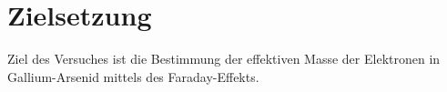 \section{Zielsetzung}
\label{sec:zielsetzung}

Ziel des Versuches ist die Bestimmung der effektiven Masse der Elektronen in Gallium-Arsenid mittels des Faraday-Effekts.